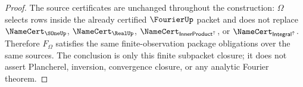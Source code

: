 \begin{proof}
The source certificates are unchanged throughout the construction: $\Omega$ selects rows inside the already certified $\FourierUp$ packet and does not replace $\NameCert_{\SOneUp}$, $\NameCert_{\RealUp}$, $\NameCert_{\mathsf{InnerProduct}^{\uparrow}}$, or $\NameCert_{\mathsf{Integral}^{\uparrow}}$. Therefore $F_{\Omega}$ satisfies the same finite-observation package obligations over the same sources. The conclusion is only this finite subpacket closure; it does not assert Plancherel, inversion, convergence closure, or any analytic Fourier theorem.
\end{proof}
